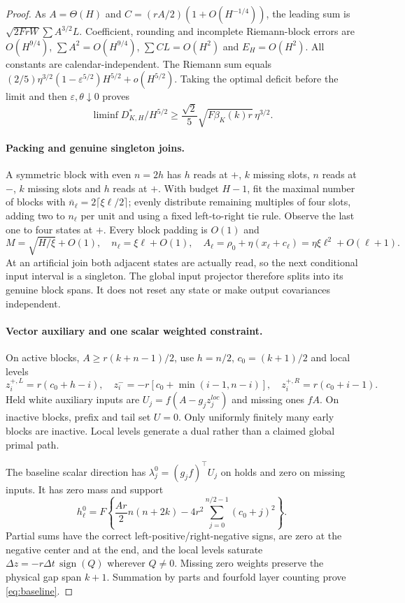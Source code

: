 \documentclass[11pt]{article}
\begin{document}
\begin{proof}
As $A=\Theta(H)$ and $C=(rA/2)(1+O(H^{-1/4}))$, the leading sum is
$\sqrt{2FrW}\sum A^{3/2}L$.
Coefficient, rounding and incomplete Riemann-block errors are $O(H^{9/4})$,
$\sum A^2=O(H^{9/4})$, $\sum CL=O(H^2)$ and $E_H=O(H^2)$.
All constants are calendar-independent.
The Riemann sum equals
$(2/5)\eta^{3/2}(1-\varepsilon^{5/2})H^{5/2}+o(H^{5/2})$.
Taking the optimal deficit before the limit and then
$\varepsilon,\theta\downarrow0$ proves
\begin{equation}\label{eq:lower}
\liminf D_{K,H}^*/H^{5/2}\ge
\frac{\sqrt2}{5}\sqrt{F\beta_K(k)r}\,\eta^{3/2}.
\end{equation}

\paragraph{Packing and genuine singleton joins.}
A symmetric block with even $n=2h$ has $h$ reads at $+$, $k$ missing slots,
$n$ reads at $-$, $k$ missing slots and $h$ reads at $+$.
With budget $H-1$, fit the maximal number of blocks with
$\bar n_\ell=2\lceil\xi\ell/2\rceil$; evenly distribute remaining multiples of
four slots, adding two to $n_\ell$ per unit and using a fixed left-to-right
tie rule. Observe the last one to four states at $+$.
Every block padding is $O(1)$ and
\[
M=\sqrt{H/\xi}+O(1),\quad n_\ell=\xi\ell+O(1),\quad
A_\ell=\rho_0+\eta(x_\ell+c_\ell)=\eta\xi\ell^2+O(\ell+1).
\]
At an artificial join both adjacent states are actually read, so the next
conditional input interval is a singleton.
The global input projector therefore splits into its genuine block spans.
It does not reset any state or make output covariances independent.

\paragraph{Vector auxiliary and one scalar weighted constraint.}
On active blocks, $A\ge r(k+n-1)/2$, use $h=n/2$, $c_0=(k+1)/2$ and local levels
\[
z_i^{+,L}=r(c_0+h-i),\quad
z_i^-=-r[c_0+\min(i-1,n-i)],\quad
z_i^{+,R}=r(c_0+i-1).
\]
Held white auxiliary inputs are $U_j=f(A-g_jz_j^{loc})$ and missing ones $fA$.
On inactive blocks, prefix and tail set $U=0$.
Only uniformly finitely many early blocks are inactive.
Local levels generate a dual rather than a claimed global primal path.

The baseline scalar direction has $\lambda_j^0=(g_jf)^\top U_j$ on holds
and zero on missing inputs. It has zero mass and support
\begin{equation}\label{eq:baseline}
h_\ell^0=F\left\{\frac{Ar}{2}n(n+2k)
-4r^2\sum_{j=0}^{n/2-1}(c_0+j)^2\right\}.
\end{equation}
Partial sums have the correct left-positive/right-negative signs,
are zero at the negative center and at the end, and the local levels
saturate $\Delta z=-r\Delta t\,\operatorname{sign}(Q)$ wherever $Q\ne0$.
Missing zero weights preserve the physical gap span $k+1$.
Summation by parts and fourfold layer counting prove \eqref{eq:baseline}.


\end{proof}
\end{document}
